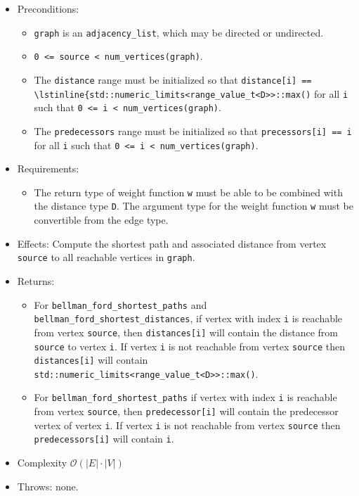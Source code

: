 \begin{itemize}
\item[] Preconditions:
\begin{itemize}
\item[]
\lstinline{graph} is an \lstinline{adjacency_list}, which may be directed or
undirected.
\item[]
\lstinline{0 <= source < num_vertices(graph)}.
\item[]
  The \lstinline{distance} range must be initialized so that 
  \lstinline{distance[i] ==  \lstinline{std::numeric_limits<range_value_t<D>>::max()} 
  for all \lstinline{i}
  such that \lstinline{0 <= i < num_vertices(graph)}.  
\item[]
  The \lstinline{predecessors} range must be initialized so that
  \lstinline{precessors[i] == i} for all \lstinline{i} such that 
  \lstinline{0 <= i < num_vertices(graph)}.
\end{itemize}
\item[] Requirements: 
\begin{itemize}
\item[]
The return type of weight function \lstinline{w} must be able to
  be combined with the distance type \lstinline{D}.  The argument type for the weight
  function \lstinline{w} must be convertible from the edge type.
\end{itemize}
\item[] 
Effects: Compute the shortest path and associated distance from vertex
\lstinline{source} to all reachable vertices in \lstinline{graph}.
\item[] 
Returns:
\begin{itemize}
\item[] For \lstinline{bellman_ford_shortest_paths} and \lstinline{bellman_ford_shortest_distances},
  if vertex with index \lstinline{i} is reachable from vertex \lstinline{source}, then
  \lstinline{distances[i]} will contain the distance from \lstinline{source} to vertex
  \lstinline{i}.  If vertex \lstinline{i} is not reachable from vertex
  \lstinline{source} then \lstinline{distances[i]} will contain
  \lstinline{std::numeric_limits<range_value_t<D>>::max()}.
\item[]
For \lstinline{bellman_ford_shortest_paths} if vertex with index \lstinline{i} is reachable
from vertex \lstinline{source}, then \lstinline{predecessor[i]} will contain the
predecessor vertex of vertex \lstinline{i}.  If vertex \lstinline{i} is not reachable
from vertex \lstinline{source} then \lstinline{predecessors[i]} will contain
\lstinline{i}.
\end{itemize}
%
\item[] Complexity $\mathcal{O}(|E| \cdot |V|)$ 
\item[] Throws: none. 
\end{itemize}


